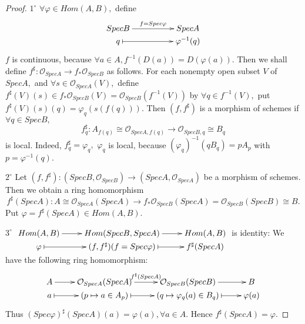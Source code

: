\begin{proof}
$\mathit{1^{\circ}}$ $\forall\varphi\in Hom(A,B),$ define
\[ \xymatrix@R=0em@C=5em{
   SpecB \ar[r]^-{f=Spec\varphi} & SpecA   \\
   q \ar@{|->}[r] & \varphi^{-1}(q) }  \]
$f$ is continuous, because $\forall a\in A,
f^{-1}(D(a))=D(\varphi(a)).$ Then we shall define
$f^{\sharp}:\mathcal {O}_{SpecA}\rightarrow f_{\ast}\mathcal
{O}_{SpecB}$ as follows. For each nonempty open subset $V$ of
$SpecA,$ and $\forall s\in \mathcal {O}_{SpecA}(V),$ define
$f^{\sharp}(V)(s)\in f_{\ast}\mathcal {O}_{SpecB}(V)=\mathcal
{O}_{SpecB}(f^{-1}(V))$ by $\forall q\in f^{-1}(V),$ put
$f^{\sharp}(V)(s)(q)=\varphi_q(s(f(q))).$ Then $(f,f^{\sharp})$ is a
morphism of schemes if $\forall q\in SpecB,$
$$f^{\sharp}_q:A_{f(q)}\cong\mathcal {O}_{SpecA,f(q)}\rightarrow \mathcal {O}_{SpecB,q}\cong
B_q$$ is local. Indeed, $f^{\sharp}_q=\varphi_q,$ $\varphi_q$ is
local, because $(\varphi_q)^{-1}(qB_q)=pA_p$ with
$p=\varphi^{-1}(q).$

$\mathit{2^{\circ}}$ Let $(f,f^{\sharp}):(SpecB,\mathcal
{O}_{SpecB})\rightarrow (SpecA,\mathcal {O}_{SpecA})$ be a morphism
of schemes. Then we obtain a ring homomorphism
$$f^{\sharp}(SpecA):A\cong\mathcal {O}_{SpecA}(SpecA)\rightarrow
f_{\ast}\mathcal {O}_{SpecB}(SpecA)=\mathcal {O}_{SpecB}(SpecB)\cong
B.$$ Put $\varphi=f^{\sharp}(SpecA)\in Hom(A,B).$

$\mathit{3^{\circ}}$
$\xymatrix@R=0em{
Hom(A,B) \ar[r] & Hom(SpecB,SpecA) \ar[r] & Hom(A,B)           \\
\varphi \ar@{|->}[r] & (f,f^{\sharp})(f=Spec\varphi) \ar@{|->}[r] &
f^{\sharp}(SpecA) } $ is identity: We have the following ring
homomorphism:
\[ \xymatrix@R=0em{
   A \ar[r] & \mathcal {O}_{SpecA}(SpecA)
   \ar[r]^-{f^{\sharp}(SpecA)} & \mathcal {O}_{SpecB}(SpecB) \ar[r]
   & B                                                           \\
   a \ar@{|->}[r] & (p\mapsto a\in A_p) \ar@{|->}[r] & (q\mapsto \varphi_q(a) \in
   B_q) \ar@{|->}[r] & \varphi(a) }  \]
Thus $(Spec\varphi)^{\sharp}(SpecA)(a)=\varphi(a),\forall a\in A.$
Hence $f^{\sharp}(SpecA)=\varphi.$


\end{proof}
